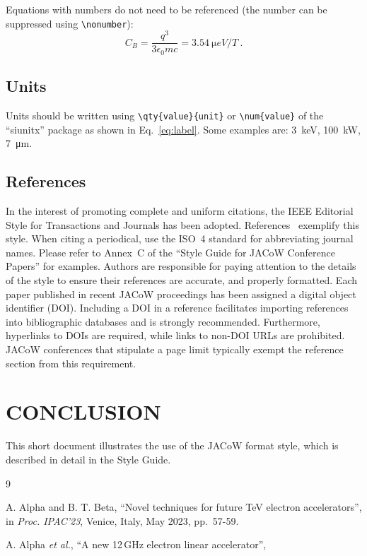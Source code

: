 \documentclass[%
               ]{jacow}
\begin{document}

Equations with numbers do not need to be referenced (the number can be suppressed using \verb|\nonumber|):
\begin{equation}\label{eq:label}
    C_B=\frac{q^3}{3\epsilon_{0}mc} = \qty{3.54}{\micro eV/T}\ .
\end{equation}

\subsection{Units}

Units should be written using \verb|\qty{value}{unit}| or \verb|\num{value}| of the “siunitx” package as shown in Eq.~\eqref{eq:label}. Some examples are: \qty{3}{keV}, \qty{100}{kW}, \qty{7}{\um}.

\subsection{References}

In the interest of promoting complete and uniform citations, 
the IEEE Editorial Style for Transactions and Journals has been adopted. 
References~\cite{ref:jacow-paper, ref:journal-paper} exemplify this style. 
When citing a periodical, use the ISO~4 standard for abbreviating journal names. 
Please refer to Annex~C of the “Style Guide for JACoW Conference Papers” for examples. 
Authors are responsible for paying attention to the details of the style to ensure their references are 
accurate, and properly formatted. 
Each paper published in recent JACoW proceedings has been assigned a digital object identifier (DOI). Including a DOI in a reference facilitates importing references into bibliographic databases and is strongly recommended. 
Furthermore, hyperlinks to DOIs are required, while links to non-DOI URLs are prohibited. 
JACoW conferences that stipulate a page limit typically exempt the reference section from this requirement.

\section{CONCLUSION}

This short document illustrates the use of the JACoW format style, which is described in detail in the Style Guide. 

\begin{thebibliography}{9} 		%
	
		A. Alpha and B. T. Beta, 
		“Novel techniques for future TeV electron accelerators”, 
		in \textit{Proc. IPAC’23}, Venice, Italy, May 2023, pp.~57-59. 
	
		A. Alpha \textit{et al.}, 
		“A new 12\,GHz electron linear accelerator”, 
		
\end{thebibliography}
\end{document}
